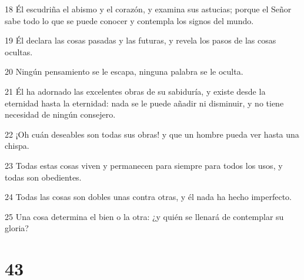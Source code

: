 \par 18 Él escudriña el abismo y el corazón, y examina sus astucias; porque el Señor sabe todo lo que se puede conocer y contempla los signos del mundo.
\par 19 Él declara las cosas pasadas y las futuras, y revela los pasos de las cosas ocultas.
\par 20 Ningún pensamiento se le escapa, ninguna palabra se le oculta.
\par 21 Él ha adornado las excelentes obras de su sabiduría, y existe desde la eternidad hasta la eternidad: nada se le puede añadir ni disminuir, y no tiene necesidad de ningún consejero.
\par 22 ¡Oh cuán deseables son todas sus obras! y que un hombre pueda ver hasta una chispa.
\par 23 Todas estas cosas viven y permanecen para siempre para todos los usos, y todas son obedientes.
\par 24 Todas las cosas son dobles unas contra otras, y él nada ha hecho imperfecto.
\par 25 Una cosa determina el bien o la otra: ¿y quién se llenará de contemplar su gloria?

\chapter{43}

